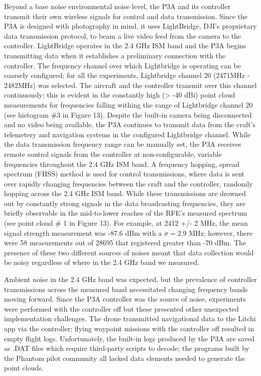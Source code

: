 \documentclass[pageno]{jpaper}
\begin{document}
Beyond a base noise environmental noise level, the P3A and its controller transmit their own wireless signals for control and data transmission. Since the P3A is designed with photography in mind, it uses LightBridge, DJI's proprietary data transmission protocol, to beam a live video feed from the camera to the controller. LightBridge operates in the 2.4 GHz ISM band and the P3A begins transmitting data when it establishes a preliminary connection with the controller. The frequency channel over which Lightbridge is operating can be coarsely configured; for all the experiments, Lightbridge channel 20 (2471MHz - 2482MHz)\cite{p3a} was selected. The aircraft and the controller transmit over this channel continuously; this is evident in the constantly high (> -40 dBi) point cloud measurements for frequencies falling withing the range of Lightbridge channel 20 (see histogram \#3 in Figure 13). Despite the built-in camera being disconnected and no video being available, the P3A continues to transmit data from the craft's telemetery and navigation systems in the configured Lightbridge channel. While the data transmission frequency range can be manually set, the P3A receives remote control signals from the controller at non-configurable, variable frequencies throughout the 2.4 GHz ISM band. A frequency hopping, spread spectrum (FHSS) method is used for control transmissions, where data is sent over rapidly changing frequencies between the craft and the controller, randomly hopping across the 2.4 GHz ISM band. While these transmissions are drowned out by constantly strong signals in the data broadcasting frequencies, they are briefly observable in the mid-to-lower reaches of the RFE's measured spectrum (see point cloud \# 1 in Figure 13). For example, at 2412 +/- 2 MHz, the mean signal strength measurement was -87.6 dBm with a $\sigma =$2.9 MHz; however, there were 58 measurements out of 28695 that registered greater than -70 dBm. The presence of these two different sources of noises meant that data collection would be noisy regardless of where in the 2.4 GHz band we measured.

Ambient noise in the 2.4 GHz band was expected, but the prevalence of controller transmissions across the measured band necessitated changing frequency bands moving forward. Since the P3A controller was the source of noise, experiments were performed with the controller off but these presented other unexpected implementation challenges. The drone transmitted navigational data to the Litchi app via the controller; flying waypoint missions with the controller off resulted in empty flight logs. Unfortunately, the built-in logs produced by the P3A are saved as .DAT files which require third-party scripts to decode; the programs built by the Phantom pilot community all lacked data elements needed to generate the point clouds. 
\end{document}
